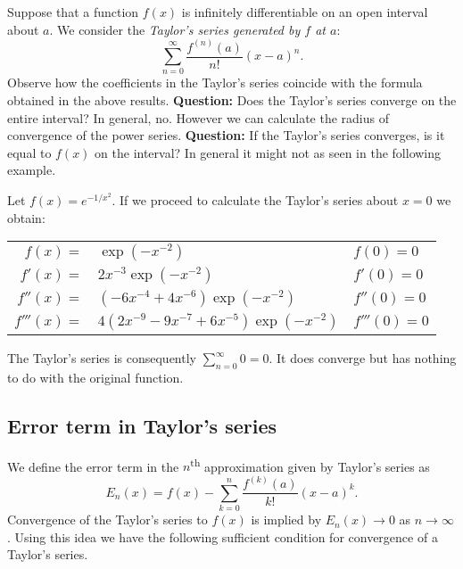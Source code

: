 Suppose that a function \(f(x)\) is infinitely differentiable on an open interval about \(a\).
We consider the \emph{Taylor's series generated by \(f\) at \(a\)}:
\[
  \sum_{n=0}^{\infty} \frac{f^{(n)}(a)}{n!} {(x-a)}^{n}.
\]
Observe how the coefficients in the Taylor's series coincide with the formula obtained in the above results.
\textbf{Question:}
Does the Taylor's series converge on the entire interval?
In general, no. However we can calculate the radius of convergence of the power series.
\textbf{Question:}
If the Taylor's series converges, is it equal to \(f(x)\) on the interval?
{In general it might not as seen in the following example.}

\begin{example*}
  Let  \(f(x) = e^{-1/x^2}\).
  If we proceed to calculate the Taylor's series about \(x=0\) we obtain:

  \begin{tabular}{ r l  l}
    \(f(x) = \)  & \( \exp(-x^{-2})\)
                 & \(f(0)=0\)                                          \\
    \(f'(x)=\)   & \( 2x^{-3} \exp(-x^{-2})\)
                 & \(f'(0)=0\)                                         \\
    \(f''(x)=\)  & \( (-6 x^{-4}   + 4x^{-6} )\exp(-x^{-2})  \)
                 & \(f''(0)=0\)                                        \\
    \(f'''(x)=\) & \( 4 (2x^{-9} - 9 x^{-7} + 6 x^{-5})\exp(-x^{-2})\) %
                 & \(f'''(0)=0\)                                       %
  \end{tabular}

  \noindent
  The Taylor's series is consequently \(\sum_{n=0}^{\infty} 0 = 0\).
  It does converge but has nothing to do with the original function.
\end{example*}



\subsection*{Error term in Taylor's series}

We define the error term in the \(n\)\textsuperscript{th} approximation given by Taylor's series as
\[
  E_n(x) = f(x) - \sum_{k=0}^{n} \frac{f^{(k)}(a)}{k!}{(x-a)}^k.
\]
Convergence of the Taylor's series to \(f(x)\) is implied by \(E_n(x) \to 0\) as \(n\to \infty\).
Using this idea we have the following sufficient condition for convergence of a Taylor's series.

